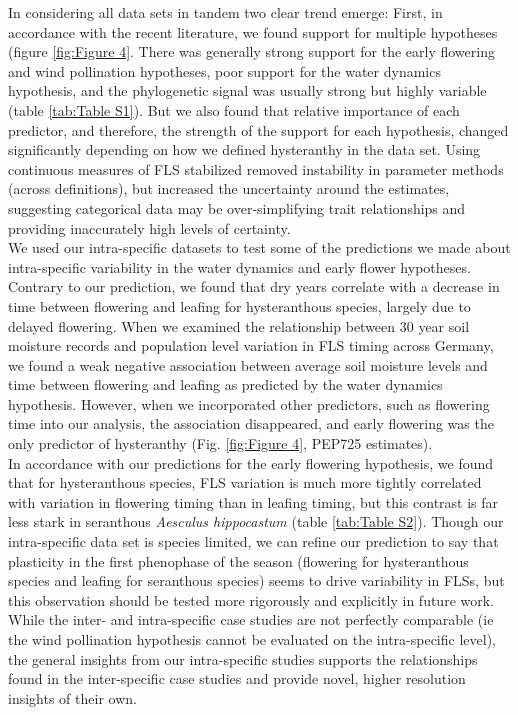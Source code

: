\documentclass[12pt]{article}\usepackage[]{graphicx}\usepackage[]{color}
\begin{document}
\indent In considering all data sets in tandem two clear trend emerge: First, in accordance with the recent literature, we found support for multiple hypotheses (figure \ref{fig:Figure 4}. There was generally strong support for the early flowering and wind pollination hypotheses, poor support for the water dynamics hypothesis, and the phylogenetic signal was usually strong but highly variable (table \ref{tab:Table S1}). But we also found that relative importance of each predictor, and therefore, the strength of the support for each hypothesis, changed significantly depending on how we defined hysteranthy in the data set. Using continuous measures of FLS stabilized removed instability in parameter methods (across definitions), but increased the uncertainty around the estimates, suggesting categorical data may be over-simplifying trait relationships and providing inaccurately high levels of certainty.\\

\indent We used our intra-specific datasets to test some of the predictions we made about intra-specific variability in the water dynamics and early flower hypotheses. Contrary to our prediction, we found that dry years correlate with a decrease in time between flowering and leafing for hysteranthous species, largely due to delayed flowering. When we examined the relationship between 30 year soil moisture records \citep{DWD} and population level variation in FLS timing across Germany, we found a weak negative association between average soil moisture levels and time between flowering and leafing as predicted by the water dynamics hypothesis. However, when we incorporated other predictors, such as flowering time into our analysis, the association disappeared, and early flowering was the only predictor of hysteranthy (Fig. \ref{fig:Figure 4}, PEP725 estimates). \\ %

\indent In accordance with our predictions for the early flowering hypothesis, we found that for hysteranthous species, FLS variation is much more tightly correlated with variation in flowering timing than in leafing timing, but this contrast is far less stark in seranthous \textit{Aesculus hippocastum} (table \ref{tab:Table S2}). Though our intra-specific data set is species limited, we can refine our prediction to say that plasticity in the first phenophase of the season (flowering for hysteranthous species and leafing for seranthous species) seems to drive variability in FLSs, but this observation should be tested more rigorously and explicitly in future work. \\
\indent While the inter- and intra-specific case studies are not perfectly comparable (ie the wind pollination hypothesis cannot be evaluated on the intra-specific level), the general insights from our intra-specific studies supports the relationships found in the inter-specific case studies and provide novel, higher resolution insights of their own.
\end{document}
